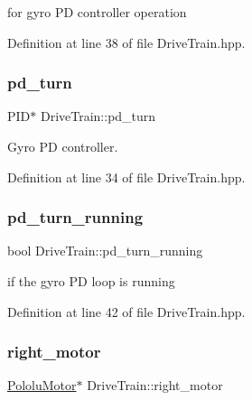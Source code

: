 for gyro PD controller operation 



Definition at line 38 of file Drive\+Train.\+hpp.

\mbox{\label{class_drive_train_a709deffb7683fd3efe0f340580a8e5e0}} 
\subsubsection{\texorpdfstring{pd\+\_\+turn}{pd\_turn}}
{\footnotesize\ttfamily P\+ID$\ast$ Drive\+Train\+::pd\+\_\+turn\hspace{0.3cm}{\ttfamily [private]}}



Gyro PD controller. 



Definition at line 34 of file Drive\+Train.\+hpp.

\mbox{\label{class_drive_train_afc2305d5c7646a92d9875973ff2f7e67}} 
\subsubsection{\texorpdfstring{pd\+\_\+turn\+\_\+running}{pd\_turn\_running}}
{\footnotesize\ttfamily bool Drive\+Train\+::pd\+\_\+turn\+\_\+running\hspace{0.3cm}{\ttfamily [private]}}



if the gyro PD loop is running 



Definition at line 42 of file Drive\+Train.\+hpp.

\mbox{\label{class_drive_train_a499c068ddd578679ac5d654e2077fbc4}} 
\subsubsection{\texorpdfstring{right\+\_\+motor}{right\_motor}}
{\footnotesize\ttfamily \hyperlink{class_pololu_motor}{Pololu\+Motor}$\ast$ Drive\+Train\+::right\+\_\+motor\hspace{0.3cm}{\ttfamily [private]}}



